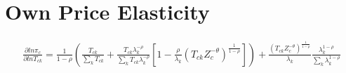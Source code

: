 \documentclass[10pt]{article}
\begin{document}
\doublespacing

\section{Own Price Elasticity}

\begin{align*}
    \frac{\partial ln \pi_c}{\partial ln T_{ck}} = \frac{1}{1 - \rho} \left(\frac{T_{ck}}{\sum_{k}^{} T_{ck}} + \frac{T_{ck} \lambda_k^{- \rho}}{\sum_{k}^{} T_{ck} \lambda_k^{- \rho}} \left[1 -\frac{\rho}{\lambda_k} (T_{ck} Z_c^{- \theta})^{\frac{1}{1 - \rho}} \right] \right) +\frac{(T_{ck} Z_c^{- \theta})^{\frac{1}{1 - \rho}}}{\lambda_k} \frac{\lambda_k^{1 - \rho}}{\sum_{k}^{} \lambda_k^{1 - \rho}}
\end{align*}
\end{document}

